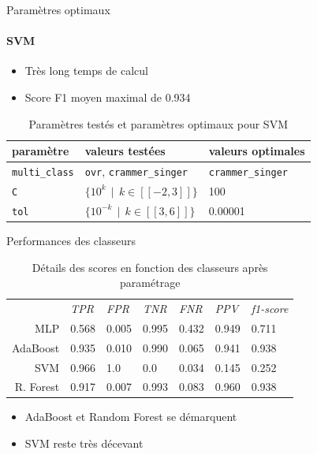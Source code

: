 \documentclass[usenames,dvipsnames]{beamer}
\begin{document}
\begin{frame}{Paramètres optimaux}
\framesubtitle{SVM}

\begin{itemize}
\item Très long temps de calcul
\item Score F1 moyen maximal de 0.934
\end{itemize}

\begin{table}
\centering
\begin{tabular}{lll}
paramètre & valeurs testées & valeurs optimales \\
\hline
\texttt{multi\_class} & \texttt{ovr}, \texttt{crammer\_singer} & \texttt{crammer\_singer} \\
\texttt{C} & $\{10^k \>\> | \>\> k \in [\![-2, 3]\!] \}$ & 100 \\
\texttt{tol} & $\{10^{-k} \>\> | \>\> k \in [\![3, 6]\!] \}$ & 0.00001 \\
\end{tabular}
\caption{Paramètres testés et paramètres optimaux pour SVM}
\end{table}

\end{frame}

\begin{frame}{Performances des classeurs}
\begin{table}
\centering
\begin{tabular}{r | llllll}
& \emph{TPR} & \emph{FPR} & \emph{TNR} & \emph{FNR} & \emph{PPV} & \emph{f1-score} \\ 
MLP & 0.568 & 0.005 & 0.995 & 0.432 & 0.949 & 0.711 \\
AdaBoost & 0.935 & 0.010 & 0.990 & 0.065 & 0.941 & 0.938 \\
SVM & 0.966 & 1.0 & 0.0 & 0.034 & 0.145 & 0.252 \\
R. Forest & 0.917 & 0.007 & 0.993 & 0.083 & 0.960 & 0.938 \\
\end{tabular}
\caption{Détails des scores en fonction des classeurs après paramétrage}
\end{table}

\begin{itemize}
\item AdaBoost et Random Forest se démarquent
\item SVM reste très décevant
\end{itemize}

\end{frame}
\end{document}
